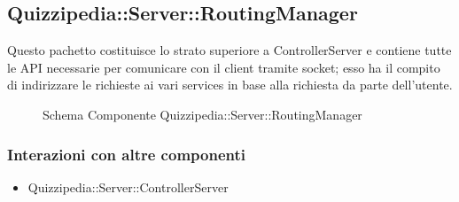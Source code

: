 \subsection{Quizzipedia::Server::RoutingManager}
Questo pachetto costituisce lo strato superiore a ControllerServer e contiene tutte le API necessarie per comunicare con il client tramite socket; esso ha il compito di indirizzare le richieste ai vari services in base alla richiesta da parte dell'utente.
\begin{figure}[H]
\centering
\noindent{}
\caption[Quizzipedia::Server::RoutingManager]{Schema Componente Quizzipedia::Server::RoutingManager}
\end{figure}
\subsubsection{Interazioni con altre componenti}
\begin{itemize}
\item Quizzipedia::Server::ControllerServer
\end{itemize}
